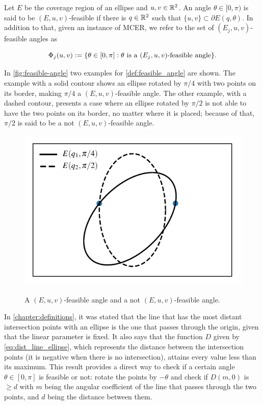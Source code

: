 \begin{definicao}\label{def:feasible_angle}
	Let $E$ be the coverage region of an ellipse and $u, v \in \mathbb{R}^2$. An angle $\theta \in [0, \pi)$ is said to be $(E, u, v)$-feasible if there is $q \in \mathbb{R}^2$ such that $\{u, v\} \subset \partial E(q, \theta)$.
	In addition to that, given an instance of MCER, we refer to the set of $(E_j, u, v)$-feasible angles as 
	
	\begin{equation}
	\Phi_j(u, v) := \{\theta \in [0, \pi] : \theta \textnormal{ is a } (E_j,u,v)\textnormal{-feasible angle}\}.
	\end{equation}
\end{definicao}

In \autoref{fig:feasible-angle} two examples for \autoref{def:feasible_angle} are shown. The example with a solid contour shows an ellipse rotated by $\pi/4$ with two points on its border, making $\pi/4$ a $(E, u, v)$-feasible angle.
The other example, with a dashed contour, presents a case where an ellipse rotated by $\pi/2$ is not able to have the two points on its border, no matter where it is placed; because of that, $\pi/2$ is said to be a not $(E, u, v)$-feasible angle.

\begin{figure}[H]
	\centering
	\caption{A $(E, u, v)$-feasible angle and a not $(E, u, v)$-feasible angle.}
	\includegraphics[scale=.8]{tex/figures/scripts/feasible-angle}
	\fautor
	\label{fig:feasible-angle}
\end{figure}

In \autoref{chapter:definitions}, it was stated that the line that has the most distant intersection points with an ellipse is the one that passes through the origin, given that the linear parameter is fixed. It also says that the function $D$ given by \autoref{eq:dist_line_ellipse}, which represents the distance between the intersection points (it is negative when there is no intersection), attains every value less than its maximum.
This result provides a direct way to check if a certain angle $\theta\in[0, \pi]$ is feasible or not: rotate the points by $-\theta$ and check if $D(m, 0)$ is $\ge d$ with $m$ being the angular coefficient of the line that passes through the two points, and $d$ being the distance between them.

